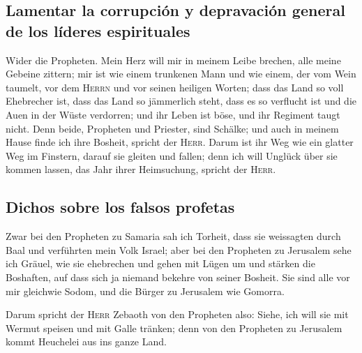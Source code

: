 \hypertarget{lamentar-la-corrupciuxf3n-y-depravaciuxf3n-general-de-los-luxedderes-espirituales}{%
\subsection{Lamentar la corrupción y depravación general de los líderes
espirituales}\label{lamentar-la-corrupciuxf3n-y-depravaciuxf3n-general-de-los-luxedderes-espirituales}}

 Wider die Propheten. Mein Herz will mir in meinem Leibe
brechen, alle meine Gebeine zittern; mir ist wie einem trunkenen Mann
und wie einem, der vom Wein taumelt, vor dem \textsc{Herrn} und vor
seinen heiligen Worten;  dass das Land so voll Ehebrecher
ist, dass das Land so jämmerlich steht, dass es so verflucht ist und die
Auen in der Wüste verdorren; und ihr Leben ist böse, und ihr Regiment
taugt nicht.  Denn beide, Propheten und Priester, sind
Schälke; und auch in meinem Hause finde ich ihre Bosheit, spricht der
\textsc{Herr}.  Darum ist ihr Weg wie ein glatter Weg im
Finstern, darauf sie gleiten und fallen; denn ich will Unglück über sie
kommen lassen, das Jahr ihrer Heimsuchung, spricht der \textsc{Herr}.

\hypertarget{dichos-sobre-los-falsos-profetas}{%
\subsection{Dichos sobre los falsos
profetas}\label{dichos-sobre-los-falsos-profetas}}

 Zwar bei den Propheten zu Samaria sah ich Torheit, dass
sie weissagten durch Baal und verführten mein Volk Israel;
 aber bei den Propheten zu Jerusalem sehe ich Gräuel, wie
sie ehebrechen und gehen mit Lügen um und stärken die Boshaften, auf
dass sich ja niemand bekehre von seiner Bosheit. Sie sind alle vor mir
gleichwie Sodom, und die Bürger zu Jerusalem wie Gomorra.

 Darum spricht der \textsc{Herr} Zebaoth von den
Propheten also: Siehe, ich will sie mit Wermut speisen und mit Galle
tränken; denn von den Propheten zu Jerusalem kommt Heuchelei aus ins
ganze Land.

